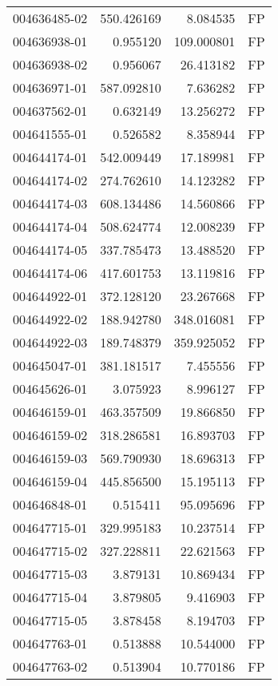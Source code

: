 \begin{tabular}{lrrl}
004636485-02 &  550.426169 &     8.084535 &   FP \\
004636938-01 &    0.955120 &   109.000801 &   FP \\
004636938-02 &    0.956067 &    26.413182 &   FP \\
004636971-01 &  587.092810 &     7.636282 &   FP \\
004637562-01 &    0.632149 &    13.256272 &   FP \\
004641555-01 &    0.526582 &     8.358944 &   FP \\
004644174-01 &  542.009449 &    17.189981 &   FP \\
004644174-02 &  274.762610 &    14.123282 &   FP \\
004644174-03 &  608.134486 &    14.560866 &   FP \\
004644174-04 &  508.624774 &    12.008239 &   FP \\
004644174-05 &  337.785473 &    13.488520 &   FP \\
004644174-06 &  417.601753 &    13.119816 &   FP \\
004644922-01 &  372.128120 &    23.267668 &   FP \\
004644922-02 &  188.942780 &   348.016081 &   FP \\
004644922-03 &  189.748379 &   359.925052 &   FP \\
004645047-01 &  381.181517 &     7.455556 &   FP \\
004645626-01 &    3.075923 &     8.996127 &   FP \\
004646159-01 &  463.357509 &    19.866850 &   FP \\
004646159-02 &  318.286581 &    16.893703 &   FP \\
004646159-03 &  569.790930 &    18.696313 &   FP \\
004646159-04 &  445.856500 &    15.195113 &   FP \\
004646848-01 &    0.515411 &    95.095696 &   FP \\
004647715-01 &  329.995183 &    10.237514 &   FP \\
004647715-02 &  327.228811 &    22.621563 &   FP \\
004647715-03 &    3.879131 &    10.869434 &   FP \\
004647715-04 &    3.879805 &     9.416903 &   FP \\
004647715-05 &    3.878458 &     8.194703 &   FP \\
004647763-01 &    0.513888 &    10.544000 &   FP \\
004647763-02 &    0.513904 &    10.770186 &   FP \\

\end{tabular}
